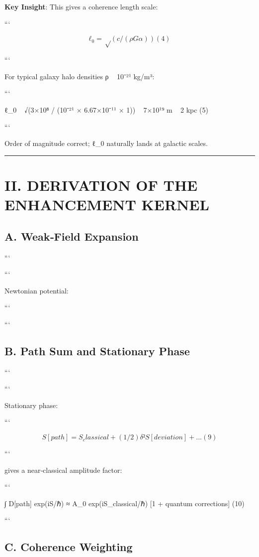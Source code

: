 \documentclass[11pt,a4paper]{article}
\begin{document}
\textbf{Key Insight}: This gives a coherence length scale:

```

\[
ℓ_0 = √(c/(ρ G α))     (4)
\]

```


For typical galaxy halo densities ρ ~ 10⁻²¹ kg/m³:

```

ℓ\_0 ~ √(3×10⁸ / (10⁻²¹ × 6.67×10⁻¹¹ × 1)) ~ 7×10¹⁹ m ~ 2 kpc     (5)

```


Order of magnitude correct; ℓ\_0 naturally lands at galactic scales.


\medskip\hrule\medskip


\section{II. DERIVATION OF THE ENHANCEMENT KERNEL}


\subsection{A. Weak‑Field Expansion}


```

```


Newtonian potential:

```

```


\subsection{B. Path Sum and Stationary Phase}


```

```


Stationary phase:

```

\[
S[path] = S_classical + (1/2)δ²S[deviation] + ...     (9)
\]

```


gives a near‑classical amplitude factor:

```

∫ D[path] exp(iS/ℏ) ≈ A\_0 exp(iS\_classical/ℏ) [1 + quantum corrections]     (10)

```


\subsection{C. Coherence Weighting}
\end{document}
